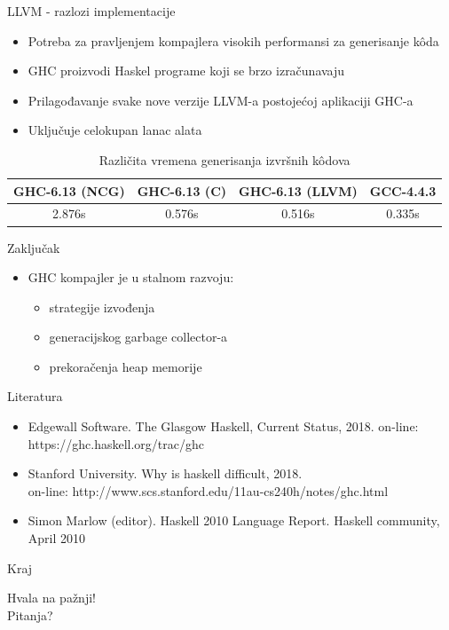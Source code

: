 \documentclass{beamer}
\begin{document}
\begin{frame}[fragile]{LLVM - razlozi implementacije}
	\begin{itemize}
		\item Potreba za pravljenjem kompajlera visokih performansi za generisanje k\^{o}da
		\item GHC proizvodi Haskel programe koji se brzo izračunavaju
		\item Prilagođavanje svake nove verzije LLVM-a postojećoj aplikaciji GHC-a
		\item Uključuje celokupan lanac alata
	\end{itemize}
	
	\begin{table}[h!]
		\begin{center}
			\begin{tabular}{||c|c|c|c||} \hline
				GHC-6.13 (NCG) & GHC-6.13 (C) & GHC-6.13 (LLVM) & GCC-4.4.3 \\ \hline
				2.876s & 0.576s & 0.516s & 0.335s \\ \hline
			\end{tabular}
			\caption{Različita vremena generisanja izvršnih k\^{o}dova}
			\label{tab:vremena}
		\end{center}
	\end{table}
	
\end{frame}

\begin{frame}[fragile]{Zaključak}
	\begin{itemize}
		\item GHC kompajler je u stalnom razvoju:
		\begin{itemize}
			\item strategije izvođenja
			\item generacijskog garbage collector-a
			\item prekoračenja heap memorije
		\end{itemize}
	\end{itemize}
\end{frame}

\begin{frame}[fragile]{Literatura}
	\begin{itemize}
		\item Edgewall Software. The Glasgow Haskell, Current Status, 2018. on-line: https://ghc.haskell.org/trac/ghc
		\item Stanford University. Why is haskell difficult, 2018. \\on-line: http://www.scs.stanford.edu/11au-cs240h/notes/ghc.html
		\item Simon Marlow (editor). Haskell 2010 Language Report. Haskell community, April 2010
		
		
	\end{itemize}
\end{frame}

\begin{frame}[fragile]{Kraj}
	
	\begin{center}
		Hvala na pažnji! \\
		\vspace{0.5cm}
		Pitanja?
	\end{center}
\end{frame}
\end{document}
